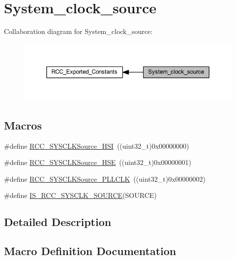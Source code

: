 \hypertarget{group___system__clock__source}{}\section{System\+\_\+clock\+\_\+source}
\label{group___system__clock__source}
Collaboration diagram for System\+\_\+clock\+\_\+source\+:
\nopagebreak
\begin{figure}[H]
\begin{center}
\leavevmode
\includegraphics[width=350pt]{group___system__clock__source}
\end{center}
\end{figure}
\subsection*{Macros}
\begin{DoxyCompactItemize}
\item 
\#define \hyperlink{group___system__clock__source_ga0f392254e74dd965c48edd5aad148e20}{R\+C\+C\+\_\+\+S\+Y\+S\+C\+L\+K\+Source\+\_\+\+H\+SI}~((uint32\+\_\+t)0x00000000)
\item 
\#define \hyperlink{group___system__clock__source_gabeae110e41833842f8620647ea0ce85a}{R\+C\+C\+\_\+\+S\+Y\+S\+C\+L\+K\+Source\+\_\+\+H\+SE}~((uint32\+\_\+t)0x00000001)
\item 
\#define \hyperlink{group___system__clock__source_ga9301b7a07a7cb8c2c6ed87b619c1c966}{R\+C\+C\+\_\+\+S\+Y\+S\+C\+L\+K\+Source\+\_\+\+P\+L\+L\+C\+LK}~((uint32\+\_\+t)0x00000002)
\item 
\#define \hyperlink{group___system__clock__source_gaae9d6172a72b0a90cb3703aa59258c57}{I\+S\+\_\+\+R\+C\+C\+\_\+\+S\+Y\+S\+C\+L\+K\+\_\+\+S\+O\+U\+R\+CE}(S\+O\+U\+R\+CE)
\end{DoxyCompactItemize}


\subsection{Detailed Description}


\subsection{Macro Definition Documentation}
\mbox{\label{group___system__clock__source_gaae9d6172a72b0a90cb3703aa59258c57}} 
